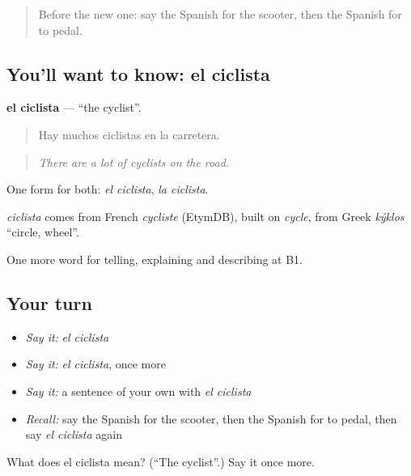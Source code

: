 \label{lesson:ES-C649-ciclista}



\begin{quote}
Before the new one: say the Spanish for the scooter, then the Spanish for to pedal.
\end{quote}

\subsection*{You'll want to know: el ciclista}
\textbf{el ciclista} — \textquotedblleft{}the cyclist\textquotedblright{}.

\begin{quote}
Hay muchos ciclistas en la carretera.
\end{quote}

\begin{quote}
\emph{There are a lot of cyclists on the road.}
\end{quote}

One form for both: \emph{el ciclista}, \emph{la ciclista}.

\begin{cousinweb}
\emph{ciclista} comes from French \emph{cycliste} (EtymDB), built on \emph{cycle}, from Greek \emph{kýklos} \textquotedblleft{}circle, wheel\textquotedblright{}.
\end{cousinweb}

\begin{grammarlens}[title={What you've built}]
One more word for telling, explaining and describing at B1.
\end{grammarlens}

\subsection*{Your turn}
\begin{itemize}
\raggedright
  \item \emph{Say it:} \emph{el ciclista}
  \item \emph{Say it:} \emph{el ciclista}, once more
  \item \emph{Say it:} a sentence of your own with \emph{el ciclista}
  \item \emph{Recall:} say the Spanish for the scooter, then the Spanish for to pedal, then say \emph{el ciclista} again
\end{itemize}

\begin{tcolorbox}[breakable,colback=teal!4,colframe=teal!35!black,title={Before you move on}]
What does el ciclista mean? (\textquotedblleft{}The cyclist\textquotedblright{}.) Say it once more.
\end{tcolorbox}
